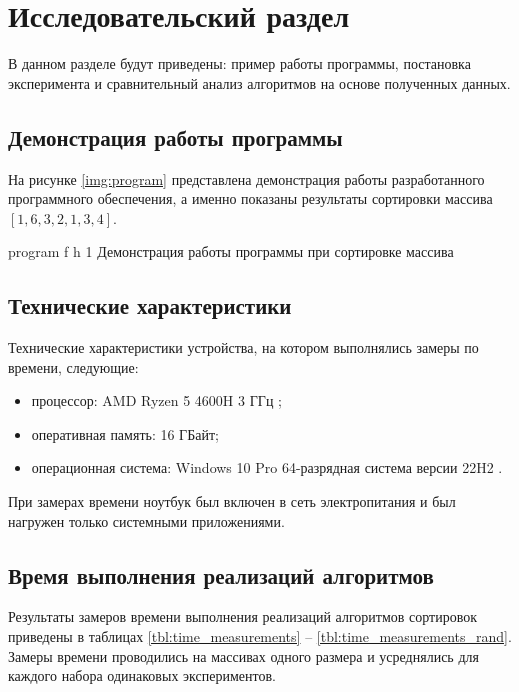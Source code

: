 \chapter{Исследовательский раздел}

В данном разделе будут приведены: пример работы программы, постановка эксперимента и сравнительный анализ алгоритмов на основе полученных данных.

\section{Демонстрация работы программы}


На рисунке \ref{img:program} представлена демонстрация работы разработанного программного обеспечения, а именно показаны результаты сортировки массива $[1, 6, 3, 2, 1, 3, 4]$.  
\clearpage

{program} %
{f} %
{h} %
{1\textwidth} %
{Демонстрация работы программы при сортировке массива} %

\clearpage


\section{Технические характеристики}

Технические характеристики устройства, на котором выполнялись замеры по времени, следующие:
\begin{itemize}
	\item процессор: AMD Ryzen 5 4600H 3 ГГц \cite{amd};
	\item оперативная память: 16 ГБайт;
	\item операционная система: Windows 10 Pro 64-разрядная система версии 22H2 \cite{windows}.
\end{itemize}

При замерах времени ноутбук был включен в сеть электропитания и был нагружен только системными приложениями.

\section{Время выполнения реализаций алгоритмов}

Результаты замеров времени выполнения реализаций алгоритмов сортировок приведены в таблицах \ref{tbl:time_measurements} -- \ref{tbl:time_measurements_rand}.
Замеры времени проводились на массивах одного размера и усреднялись для каждого набора одинаковых экспериментов.

